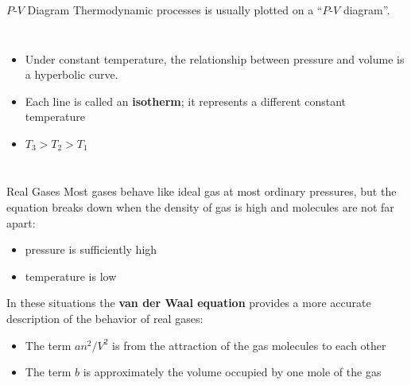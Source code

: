 \documentclass[12pt,aspectratio=169]{beamer}
\newcommand{\eq}[2]{
  \vspace{#1}{\Large
    \begin{displaymath}
      #2
    \end{displaymath}
  }
}
\begin{document}
\begin{frame}{$P$-$V$ Diagram}
  Thermodynamic processes is usually plotted on a ``$P$-$V$ diagram''.
  \begin{columns}

    \begin{itemize}
    \item Under constant temperature, the relationship between pressure and
      volume is a hyperbolic curve.
    \item Each line is called an \textbf{isotherm}; it represents a different
      constant temperature
    \item $T_3>T_2>T_1$
    \end{itemize}
  \end{columns}
  
\end{frame}



\begin{frame}{Real Gases}
  Most gases behave like ideal gas at most ordinary pressures, but the
  equation breaks down when the density of gas is high and molecules are not
  far apart:
  \begin{itemize}
  \item pressure is sufficiently high
  \item temperature is low
  \end{itemize}
  In these situations the \textbf{van der Waal equation} provides a more
  accurate description of the behavior of real gases:

  \eq{-.2in}{
    \boxed{\left(P+\frac{an^2}{V^2}\right)(V-bn)=nRT}
  }

  \begin{itemize}
  \item The term $an^2/V^2$ is from the attraction of the gas molecules to each
    other
  \item The term $b$ is approximately the volume occupied by one mole of the gas
  \end{itemize}
\end{frame}
\end{document}
